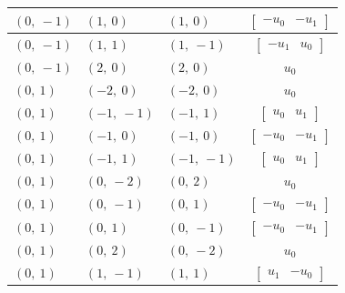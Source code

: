 \documentclass[11pt]{article}
\theoremstyle{definition}
\begin{document}
\begin{longtable}{|l|l|l|c|}
    \hline
    $\left( 0, \  -1\right)$ & $\left( 1, \  0\right)$ & $\left( 1, \  0\right)$ & $\left[\begin{matrix}- u_{0} & - u_{1}\end{matrix}\right]$ \\
    \hline
    $\left( 0, \  -1\right)$ & $\left( 1, \  1\right)$ & $\left( 1, \  -1\right)$ & $\left[\begin{matrix}- u_{1} & u_{0}\end{matrix}\right]$ \\
    \hline
    $\left( 0, \  -1\right)$ & $\left( 2, \  0\right)$ & $\left( 2, \  0\right)$ & $u_{0}$ \\
    \hline
    $\left( 0, \  1\right)$ & $\left( -2, \  0\right)$ & $\left( -2, \  0\right)$ & $u_{0}$ \\
    \hline
    $\left( 0, \  1\right)$ & $\left( -1, \  -1\right)$ & $\left( -1, \  1\right)$ & $\left[\begin{matrix}u_{0} & u_{1}\end{matrix}\right]$ \\
    \hline
    $\left( 0, \  1\right)$ & $\left( -1, \  0\right)$ & $\left( -1, \  0\right)$ & $\left[\begin{matrix}- u_{0} & - u_{1}\end{matrix}\right]$ \\
    \hline
    $\left( 0, \  1\right)$ & $\left( -1, \  1\right)$ & $\left( -1, \  -1\right)$ & $\left[\begin{matrix}u_{0} & u_{1}\end{matrix}\right]$ \\
    \hline
    $\left( 0, \  1\right)$ & $\left( 0, \  -2\right)$ & $\left( 0, \  2\right)$ & $u_{0}$ \\
    \hline
    $\left( 0, \  1\right)$ & $\left( 0, \  -1\right)$ & $\left( 0, \  1\right)$ & $\left[\begin{matrix}- u_{0} & - u_{1}\end{matrix}\right]$ \\
    \hline
    $\left( 0, \  1\right)$ & $\left( 0, \  1\right)$ & $\left( 0, \  -1\right)$ & $\left[\begin{matrix}- u_{0} & - u_{1}\end{matrix}\right]$ \\
    \hline
    $\left( 0, \  1\right)$ & $\left( 0, \  2\right)$ & $\left( 0, \  -2\right)$ & $u_{0}$ \\
    \hline
    $\left( 0, \  1\right)$ & $\left( 1, \  -1\right)$ & $\left( 1, \  1\right)$ & $\left[\begin{matrix}u_{1} & - u_{0}\end{matrix}\right]$ \\

\end{longtable}
\end{document}
